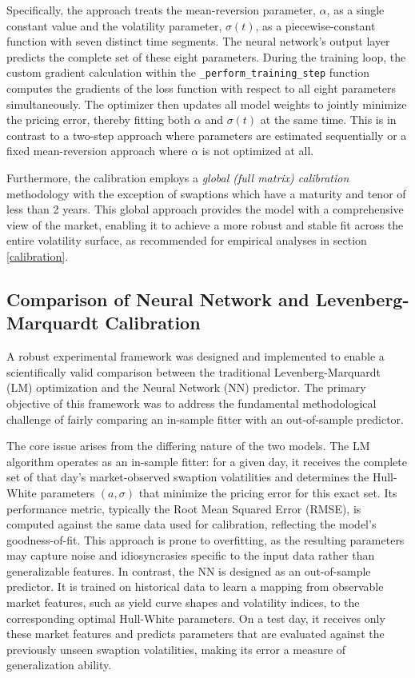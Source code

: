 {Specifically, the approach treats the mean-reversion parameter, $\alpha$, as a single constant value and the volatility parameter, $\sigma(t)$, as a piecewise-constant function with seven distinct time segments. The neural network's output layer predicts the complete set of these eight parameters. During the training loop, the custom gradient calculation within the \texttt{\_perform\_training\_step} function computes the gradients of the loss function with respect to all eight parameters simultaneously. The optimizer then updates all model weights to jointly minimize the pricing error, thereby fitting both $\alpha$ and $\sigma(t)$ at the same time. This is in contrast to a two-step approach where parameters are estimated sequentially or a fixed mean-reversion approach where $\alpha$ is not optimized at all.

Furthermore, the calibration employs a \textit{global (full matrix) calibration} methodology with the exception of swaptions which have a maturity and tenor of less than 2 years. This global approach provides the model with a comprehensive view of the market, enabling it to achieve a more robust and stable fit across the entire volatility surface, as recommended for empirical analyses in section \ref{calibration}.

\subsection{Comparison of Neural Network and Levenberg-Marquardt Calibration}
A robust experimental framework was designed and implemented to enable a scientifically valid comparison between the traditional Levenberg-Marquardt (LM) optimization and the Neural Network (NN) predictor. The primary objective of this framework was to address the fundamental methodological challenge of fairly comparing an in-sample fitter with an out-of-sample predictor.  

The core issue arises from the differing nature of the two models. The LM algorithm operates as an in-sample fitter: for a given day, it receives the complete set of that day's market-observed swaption volatilities and determines the Hull-White parameters $(a, \sigma)$ that minimize the pricing error for this exact set. Its performance metric, typically the Root Mean Squared Error (RMSE), is computed against the same data used for calibration, reflecting the model's goodness-of-fit. This approach is prone to overfitting, as the resulting parameters may capture noise and idiosyncrasies specific to the input data rather than generalizable features. In contrast, the NN is designed as an out-of-sample predictor. It is trained on historical data to learn a mapping from observable market features, such as yield curve shapes and volatility indices, to the corresponding optimal Hull-White parameters. On a test day, it receives only these market features and predicts parameters that are evaluated against the previously unseen swaption volatilities, making its error a measure of generalization ability.  

}
